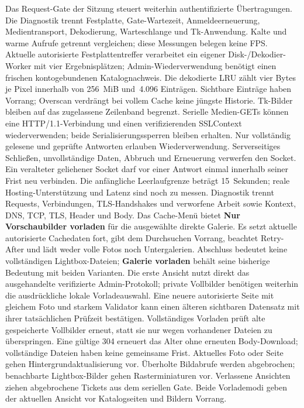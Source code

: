 \documentclass[11pt,a4paper]{article}
\begin{document}
Das Request-Gate der Sitzung steuert weiterhin authentifizierte Übertragungen.
Die Diagnostik trennt Festplatte, Gate-Wartezeit, Anmeldeerneuerung,
Medientransport, Dekodierung, Warteschlange und Tk-Anwendung. Kalte und warme
Aufrufe getrennt vergleichen; diese Messungen belegen keine FPS.
Aktuelle autorisierte Festplattentreffer verarbeitet ein eigener
Disk-/Dekodier-Worker mit vier Ergebnisplätzen; Admin-Wiederverwendung benötigt
einen frischen kontogebundenen Katalognachweis. Die dekodierte LRU zählt vier
Bytes je Pixel
innerhalb von 256~MiB und~4.096 Einträgen. Sichtbare Einträge haben Vorrang;
Overscan verdrängt bei vollem Cache keine jüngste Historie. Tk-Bilder bleiben
auf das zugelassene Zeilenband begrenzt.
Serielle Medien-GETs können eine HTTP/1.1-Verbindung und einen verifizierenden
SSLContext wiederverwenden; beide Serialisierungssperren bleiben erhalten.
Nur vollständig gelesene und geprüfte Antworten erlauben Wiederverwendung.
Serverseitiges Schließen, unvollständige Daten, Abbruch und Erneuerung
verwerfen den Socket. Ein veralteter geliehener Socket darf vor einer Antwort
einmal innerhalb seiner Frist neu verbinden. Die anfängliche Leerlaufgrenze
beträgt 15~Sekunden; reale Hosting-Unterstützung und Latenz sind noch zu messen.
Diagnostik trennt Requests, Verbindungen, TLS-Handshakes und verworfene Arbeit
sowie Kontext, DNS, TCP, TLS, Header und Body.
Das Cache-Menü bietet \textbf{Nur Vorschaubilder vorladen} für die ausgewählte
direkte Galerie. Es setzt aktuelle autorisierte Cachedaten fort, gibt dem
Durchsuchen Vorrang, beachtet Retry-After und lädt weder volle Fotos noch
Untergalerien. Abschluss bedeutet keine vollständigen Lightbox-Dateien;
\textbf{Galerie vorladen} behält seine bisherige Bedeutung mit beiden Varianten.
Die erste Ansicht nutzt direkt das ausgehandelte verifizierte Admin-Protokoll;
private Vollbilder benötigen weiterhin die ausdrückliche lokale Vorladeauswahl.
Eine neuere autorisierte Seite mit gleichem Foto und starkem Validator kann
einen älteren sichtbaren Datensatz mit ihrer tatsächlichen Prüfzeit bestätigen.
Vollständiges Vorladen prüft alte gespeicherte Vollbilder erneut, statt sie nur
wegen vorhandener Dateien zu überspringen. Eine gültige 304 erneuert das Alter
ohne erneuten Body-Download; vollständige Dateien haben keine gemeinsame Frist.
Aktuelles Foto oder Seite gehen Hintergrundaktualisierung vor. Überholte
Bildabrufe werden abgebrochen; benachbarte Lightbox-Bilder gehen Rasterminiaturen
vor. Verlassene Ansichten ziehen abgebrochene Tickets aus dem seriellen Gate.
Beide Vorlademodi geben der aktuellen Ansicht vor Katalogseiten und Bildern Vorrang.
\end{document}
